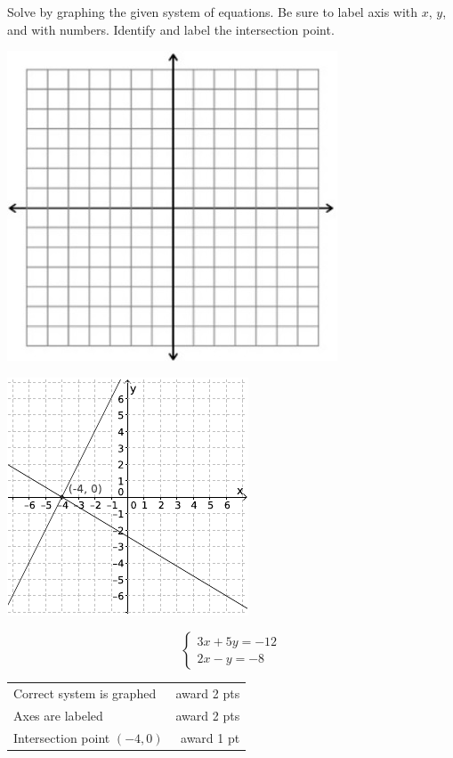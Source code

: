 {
	Solve by graphing the given system of equations. Be sure to label axis with $x$, $y$, and with numbers. Identify and label the intersection point. \begin{onlyproblem}\begin{center}\includegraphics{fig-graphpaper.png}\end{center}\end{onlyproblem} \begin{onlysolution}\begin{center}\includegraphics{fig095-10-a-answer}\end{center}\end{onlysolution}
	$$\begin{cases} 3x+5y=-12\\ 2x-y=-8\end{cases}$$
}
{
	\begin{tabular}{l r}
	Correct system is graphed & award 2 pts\\
	Axes are labeled & award 2 pts\\
	Intersection point $(-4,0)$ & award 1 pt
	\end{tabular}
}


